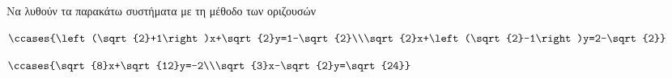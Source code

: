 Να λυθούν τα παρακάτω συστήματα με τη μέθοδο των οριζουσών
\begin{multicols}{2}
\begin{alist}
\item $ \ccases{\left(\sqrt{2}+1\right)x+\sqrt{2}y=1-\sqrt{2}\\\sqrt{2}x+\left(\sqrt{2}-1\right)y=2-\sqrt{2}} $
\end{alist}
\item $ \ccases{\sqrt{8}x+\sqrt{12}y=-2\\\sqrt{3}x-\sqrt{2}y=\sqrt{24}} $
\end{multicols}
